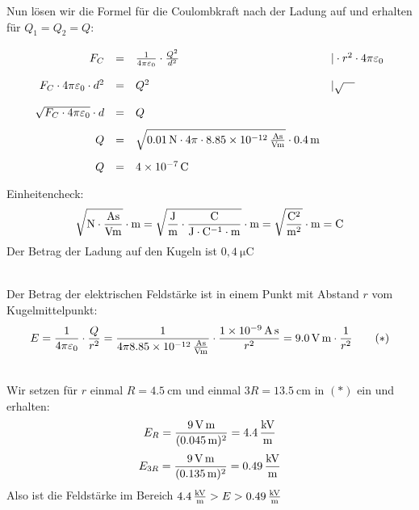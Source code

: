 \documentclass[a4paper]{article}
\begin{document}
\noindent Nun lösen wir die Formel für die Coulombkraft nach der Ladung auf und erhalten für $Q_1=Q_2=Q$:
$$
\renewcommand{\arraystretch}{2}
\begin{array}{rcll}
F_C  & = & {1 \over 4 \pi \varepsilon_0}\cdot {Q^2 \over d^2} & | \cdot r^2 \cdot  4 \pi \varepsilon_0 \\
F_C \cdot 4 \pi \varepsilon_0 \cdot d^2 & = & Q^2 & | \sqrt{\quad}\\
\sqrt{F_C \cdot 4 \pi \varepsilon_0}\cdot d & = & Q \\
Q & = & \sqrt{\SI{0,01}{\newton}  \cdot 4 \pi \cdot\SI{8,85e-12}{\ampere\second \over \volt\meter}} \cdot \SI{0,4}{\meter} \\
Q & = & \SI{4e-7}{\coulomb} 
\end{array}
$$
Einheitencheck:
$$\sqrt{\SI{}{\newton \cdot {\ampere\second\over \volt\meter}}} \cdot \SI{}{\meter} = \sqrt{\SI{}{{\joule \over \meter} \cdot {\coulomb \over \joule \cdot \coulomb^{-1}\cdot \meter}}} \cdot \SI{}{\meter} = \sqrt{ \SI{}{{\coulomb^2} \over {\meter^2}}} \cdot \SI{}{\meter} = \SI{}{\coulomb}$$ 
Der Betrag der Ladung auf den Kugeln ist $0,4\SI{}{\micro \coulomb}$
\vspace{0.5 cm}

\\
Der Betrag der elektrischen Feldstärke ist in einem Punkt mit Abstand $r$ vom Kugelmittelpunkt:
$$ E =  {1 \over 4 \pi \varepsilon_0}\cdot {Q \over r^2} =
  {1 \over 4 \pi \SI{8,85e-12}{\ampere\second\over \volt\meter}}\cdot {\SI{1e-9}{\ampere\second} \over r^2}= \SI{9,0}{\volt\meter} \cdot{1 \over r^2} \qquad (*)$$
\vspace{0.5 cm}

\\
Wir setzen für $r$ einmal $R=\SI{4,5}{\centi\meter}$ und einmal $3R=\SI{13,5}{\centi\meter}$ in $(*)$ ein und erhalten:
$$ E_R = {\SI{9}{\volt\meter} \over (\SI{0,045}{\meter})^2}= \SI{4,4}{\kilo\volt\over\meter}$$
$$ E_{3R} =  {\SI{9}{\volt\meter} \over (\SI{0,135}{\meter})^2}= \SI{0,49}{\kilo\volt\over\meter}$$
Also ist die Feldstärke im Bereich $\SI{4,4}{\kilo\volt\over\meter} > E > \SI{0,49}{\kilo\volt\over\meter}$
\vspace{1 cm}
\end{document}
